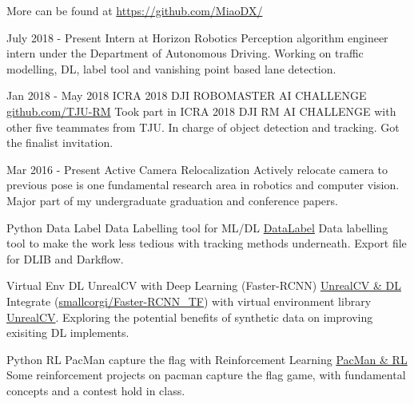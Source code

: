 \documentclass[utf8]{twentysecondcv} %
\begin{document}
\begin{twenty}
    \vspace{-8pt}
    \twentyitem
        {}
        {}        
        {More can be found at \href{https://github.com/MiaoDX/}{https://github.com/MiaoDX/}}
        {}
        {}
        {}
        
    
    \twentyitem
    {July 2018 - }
    {Present}
    {Intern at Horizon Robotics}
    {}
    {}
    {Perception algorithm engineer intern under the Department of Autonomous Driving. Working on traffic modelling, DL, label tool and vanishing point based lane detection.\vspace{7pt}}
	
          
    \twentyitem
    {Jan 2018 - }
    {May 2018}
    {ICRA 2018 DJI ROBOMASTER AI CHALLENGE}
    {\href{https://github.com/TJU-RM}{github.com/TJU-RM}}
    {}
    {Took part in ICRA 2018 DJI RM AI CHALLENGE with other five teammates from TJU. In charge of object detection and tracking. Got the finalist invitation.}
    
    \twentyitem
    {Mar 2016 -}
    {Present}
    {Active Camera Relocalization}
    {}
    {}
    {Actively relocate camera to previous pose is one fundamental research area in robotics and computer vision. Major part of my undergraduate graduation and conference papers.}
    
	\twentyitem
        {Python}
		{Data Label}
        {Data Labelling tool for ML/DL}
        {\href{https://github.com/MiaoDX/DataLabel}{DataLabel}}
        {}
        {Data labelling tool to make the work less tedious with tracking methods underneath. Export file for DLIB and Darkflow.}
          
    \twentyitem
        {Virtual Env}
      	{DL}
        {UnrealCV with Deep Learning (Faster-RCNN)}
        {\href{https://github.com/MiaoDX/unrealcv_examples/}{UnrealCV \& DL}}
        {}
        {Integrate (\href{https://github.com/smallcorgi/Faster-RCNN\_TF}{smallcorgi/Faster-RCNN\_TF}) with virtual environment library \href{https://github.com/unrealcv/unrealcv}{UnrealCV}. Exploring the potential benefits of synthetic data on improving exisiting DL implements.}
                 
    \twentyitem
        {Python}
		{RL}
        {PacMan capture the flag with Reinforcement Learning}
        {\href{https://github.com/MiaoDX/hand_in_homework/tree/master/Advanced\_AI/}{PacMan \& RL}}
        {}
        {Some reinforcement projects on pacman capture the flag game, with fundamental concepts and a contest hold in class.}
        

\end{twenty}
\end{document}
